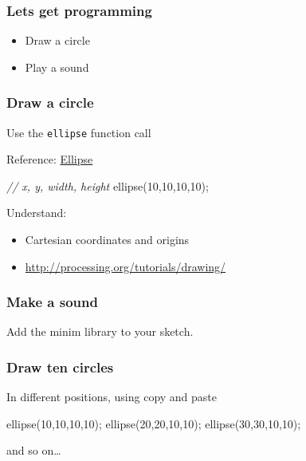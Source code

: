 \documentclass[ignorenonframetext,]{beamer}
\newenvironment{Shaded}{}{}
\newcommand{\DecValTok}[1]{\textcolor[rgb]{0.25,0.63,0.44}{{#1}}}
\newcommand{\CommentTok}[1]{\textcolor[rgb]{0.38,0.63,0.69}{\textit{{#1}}}}
\newcommand{\FunctionTok}[1]{\textcolor[rgb]{0.02,0.16,0.49}{{#1}}}
\newcommand{\NormalTok}[1]{{#1}}
\begin{document}
\begin{frame}\frametitle{Lets get programming}

\begin{itemize}
\item
  Draw a circle
\item
  Play a sound
\end{itemize}

\end{frame}

\begin{frame}[fragile]\frametitle{Draw a circle}

Use the \texttt{ellipse} function call

Reference:
\href{http://processing.org/reference/ellipse\_.html}{Ellipse}

\begin{Shaded}
\begin{Highlighting}[]
\CommentTok{// x, y, width, height}
\FunctionTok{ellipse}\NormalTok{(}\DecValTok{10}\NormalTok{,}\DecValTok{10}\NormalTok{,}\DecValTok{10}\NormalTok{,}\DecValTok{10}\NormalTok{);}
\end{Highlighting}
\end{Shaded}

Understand:

\begin{itemize}
\item
  Cartesian coordinates and origins
\item
  \url{http://processing.org/tutorials/drawing/}
\end{itemize}

\end{frame}

\begin{frame}\frametitle{Make a sound}

Add the minim library to your sketch.

\end{frame}

\begin{frame}[fragile]\frametitle{Draw ten circles}

In different positions, using copy and paste

\begin{Shaded}
\begin{Highlighting}[]
\FunctionTok{ellipse}\NormalTok{(}\DecValTok{10}\NormalTok{,}\DecValTok{10}\NormalTok{,}\DecValTok{10}\NormalTok{,}\DecValTok{10}\NormalTok{);}
\FunctionTok{ellipse}\NormalTok{(}\DecValTok{20}\NormalTok{,}\DecValTok{20}\NormalTok{,}\DecValTok{10}\NormalTok{,}\DecValTok{10}\NormalTok{);}
\FunctionTok{ellipse}\NormalTok{(}\DecValTok{30}\NormalTok{,}\DecValTok{30}\NormalTok{,}\DecValTok{10}\NormalTok{,}\DecValTok{10}\NormalTok{);}
\end{Highlighting}
\end{Shaded}

and so on\ldots{}

\end{frame}
\end{document}
